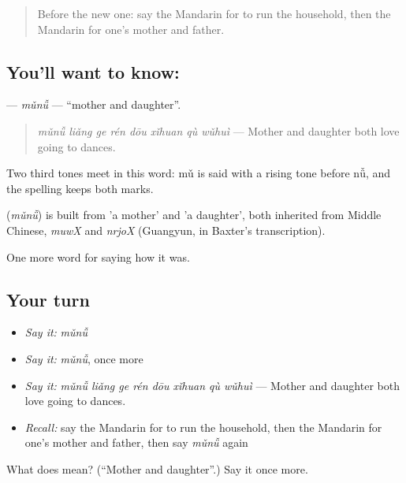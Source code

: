 \label{lesson:ZH-C509-munu}



\begin{quote}
Before the new one: say the Mandarin for to run the household, then the Mandarin for one's mother and father.
\end{quote}

\subsection*{You'll want to know: }
\textbf{} — \emph{mǔnǚ} — \textquotedblleft{}mother and daughter\textquotedblright{}.

\begin{quote}
\textbf{} \emph{mǔnǚ liǎng ge rén dōu xǐhuan qù wǔhuì} — Mother and daughter both love going to dances.
\end{quote}

Two third tones meet in this word: mǔ is said with a rising tone before nǚ, and the spelling keeps both marks.

\begin{cousinweb}
\textbf{} (\emph{mǔnǚ}) is built from  'a mother' and  'a daughter', both inherited from Middle Chinese, \emph{muwX} and \emph{nrjoX} (Guangyun, in Baxter's transcription).
\end{cousinweb}

\begin{grammarlens}[title={What you've built}]
One more word for saying how it was.
\end{grammarlens}

\subsection*{Your turn}
\begin{itemize}
\raggedright
  \item \emph{Say it:} \emph{mǔnǚ}
  \item \emph{Say it:} \emph{mǔnǚ}, once more
  \item \emph{Say it:} \emph{mǔnǚ liǎng ge rén dōu xǐhuan qù wǔhuì} — Mother and daughter both love going to dances.
  \item \emph{Recall:} say the Mandarin for to run the household, then the Mandarin for one's mother and father, then say \emph{mǔnǚ} again
\end{itemize}

\begin{tcolorbox}[breakable,colback=teal!4,colframe=teal!35!black,title={Before you move on}]
What does  mean? (\textquotedblleft{}Mother and daughter\textquotedblright{}.) Say it once more.
\end{tcolorbox}
